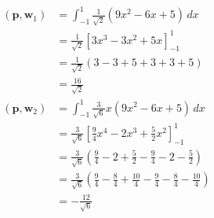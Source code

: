 \documentclass{article}
\begin{document}
\setcounter{subsubsection}{20}
\subsubsection{}

\begin{align*}
  (\mathbf{p}, \mathbf{w}_1) & = \int_{-1}^1 \frac{1}{\sqrt{2}} (9 x^2 - 6 x + 5) \,dx                                                                                                                                              \\
                             & = \frac{1}{\sqrt{2}} \left[ 3 x^3 - 3 x^2 + 5 x \right]_{-1}^1                                                                                                                                       \\
                             & = \frac{1}{\sqrt{2}} (3 - 3 + 5 + 3 + 3 + 5)                                                                                                                                                         \\
                             & = \frac{16}{\sqrt{2}}                                                                                                                                                                                \\
  (\mathbf{p}, \mathbf{w}_2) & = \int_{-1}^1 \frac{3}{\sqrt{6}} x (9 x^2 - 6 x + 5) \,dx                                                                                                                                            \\
                             & = \frac{3}{\sqrt{6}} \left[ \frac{9}{4} x^4 - 2 x^3 + \frac{5}{2} x^2 \right]_{-1}^1                                                                                                                 \\
                             & = \frac{3}{\sqrt{6}} \left( \frac{9}{4} - 2 + \frac{5}{2} - \frac{9}{4} - 2 - \frac{5}{2} \right)                                                                                                    \\
                             & = \frac{3}{\sqrt{6}} \left( \frac{9}{4} - \frac{8}{4} + \frac{10}{4} - \frac{9}{4} - \frac{8}{4} - \frac{10}{4} \right)                                                                              \\
                             & = -\frac{12}{\sqrt{6}}                                                                                                                                                                               \\

\end{align*}
\end{document}
